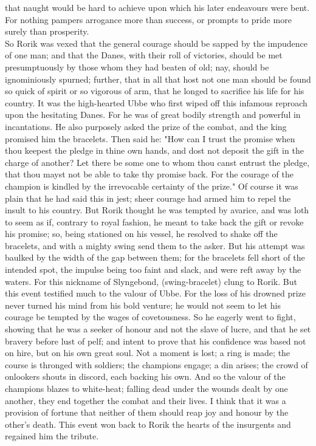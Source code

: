 \documentclass[10pt,a4paper]{report}
\begin{document}
that naught would be hard to achieve upon which his later endeavours were bent. For nothing pampers arrogance more than success, or prompts to pride more surely than prosperity.\\

So Rorik was vexed that the general courage should be sapped by the impudence of one man; and that the Danes, with their roll of victories, should be met presumptuously by those whom they had beaten of old; nay, should be ignominiously spurned; further, that in all that host not one man should be found so quick of spirit or so vigorous of arm, that he longed to sacrifice his life for his country. It was the high-hearted Ubbe who first wiped off this infamous reproach upon the hesitating Danes. For he was of great bodily strength and powerful in incantations. He also purposely asked the prize of the combat, and the king promised him the bracelets. Then said he: "How can I trust the promise when thou keepest the pledge in thine own hands, and dost not deposit the gift in the charge of another? Let there be some one to whom thou canst entrust the pledge, that thou mayst not be able to take thy promise back. For the courage of the champion is kindled by the irrevocable certainty of the prize." Of course it was plain that he had said this in jest; sheer courage had armed him to repel the insult to his country. But Rorik thought he was tempted by avarice, and was loth to seem as if, contrary to royal fashion, he meant to take back the gift or revoke his promise; so, being stationed on his vessel, he resolved to shake off the bracelets, and with a mighty swing send them to the asker. But his attempt was baulked by the width of the gap between them; for the bracelets fell short of the intended spot, the impulse being too faint and slack, and were reft away by the waters. For this nickname of Slyngebond, (swing-bracelet) clung to Rorik. But this event testified much to the valour of Ubbe. For the loss of his drowned prize never turned his mind from his bold venture; he would not seem to let his courage be tempted by the wages of covetousness. So he eagerly went to fight, showing that he was a seeker of honour and not the slave of lucre, and that he set bravery before lust of pelf; and intent to prove that his confidence was based not on hire, but on his own great soul. Not a moment is lost; a ring is made; the course is thronged with soldiers; the champions engage; a din arises; the crowd of onlookers shouts in discord, each backing his own. And so the valour of the champions blazes to white-heat; falling dead under the wounds dealt by one another, they end together the combat and their lives. I think that it was a provision of fortune that neither of them should reap joy and honour by the other's death. This event won back to Rorik the hearts of the insurgents and regained him the tribute.\\
\end{document}
